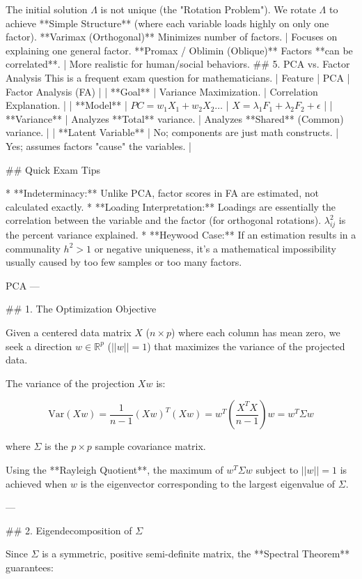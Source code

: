 The initial solution $\Lambda$ is not unique (the "Rotation Problem"). We rotate $\Lambda$ to achieve **Simple Structure** (where each variable loads highly on only one factor).
 **Varimax (Orthogonal)** Minimizes number of factors. | Focuses on explaining one general factor.
 **Promax / Oblimin (Oblique)** Factors **can be correlated**. | More realistic for human/social behaviors.
## 5. PCA vs. Factor Analysis
This is a frequent exam question for mathematicians.
| Feature | PCA | Factor Analysis (FA) |
| **Goal** | Variance Maximization. | Correlation Explanation. |
| **Model** | $PC = w_1X_1 + w_2X_2 \dots$ | $X = \lambda_1F_1 + \lambda_2F_2 + \epsilon$ |
| **Variance** | Analyzes **Total** variance. | Analyzes **Shared** (Common) variance. |
| **Latent Variable** | No; components are just math constructs. | Yes; assumes factors "cause" the variables. |

## Quick Exam Tips

* **Indeterminacy:** Unlike PCA, factor scores in FA are estimated, not calculated exactly.
* **Loading Interpretation:** Loadings are essentially the correlation between the variable and the factor (for orthogonal rotations). 
$\lambda_{ij}^2$ is the percent variance explained.
* **Heywood Case:** If an estimation results in a communality $h^2 > 1$ or negative uniqueness, it's a mathematical impossibility usually caused by too few samples or too many factors.



PCA
---

## 1. The Optimization Objective

Given a centered data matrix $X$ ($n \times p$) where each column has mean zero, we seek a direction $w \in \mathbb{R}^p$ ($||w|| = 1$) that maximizes the variance of the projected data.

The variance of the projection $Xw$ is:


$$\text{Var}(Xw) = \frac{1}{n-1} (Xw)^T(Xw) = w^T \left( \frac{X^T X}{n-1} \right) w = w^T \Sigma w$$


where $\Sigma$ is the $p \times p$ sample covariance matrix.

Using the **Rayleigh Quotient**, the maximum of $w^T \Sigma w$ subject to $||w|| = 1$ is achieved when $w$ is the eigenvector corresponding to the largest eigenvalue of $\Sigma$.

---

## 2. Eigendecomposition of $\Sigma$

Since $\Sigma$ is a symmetric, positive semi-definite matrix, the **Spectral Theorem** guarantees:


